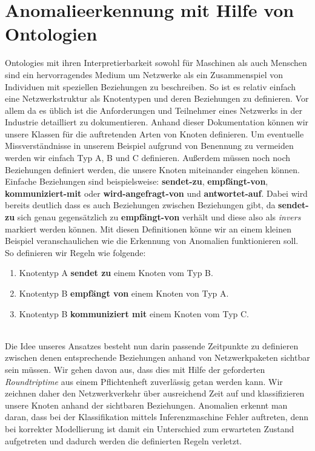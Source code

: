 \section{\nohyphens{Anomalieerkennung mit Hilfe von Ontologien}}
\Glspl{Ontologie} mit ihren Interpretierbarkeit sowohl für Maschinen als auch Menschen sind ein hervorragendes Medium um Netzwerke als ein Zusammenspiel von Individuen mit speziellen Beziehungen zu beschreiben. So ist es relativ einfach eine Netzwerkstruktur als Knotentypen und deren Beziehungen zu definieren. Vor allem da es üblich ist die Anforderungen und Teilnehmer eines Netzwerks in der Industrie detailliert zu dokumentieren. Anhand dieser Dokumentation können wir unsere Klassen für die auftretenden Arten von Knoten definieren. Um eventuelle Missverständnisse in unserem Beispiel aufgrund von Benennung zu vermeiden werden wir einfach Typ A, B und C definieren. Außerdem müssen noch noch Beziehungen definiert werden, die unsere Knoten miteinander eingehen können. Einfache Beziehungen sind beispielsweise: \textbf{sendet-zu}, \textbf{empfängt-von}, \textbf{kommuniziert-mit} oder \textbf{wird-angefragt-von} und \textbf{antwortet-auf}. Dabei wird bereits deutlich dass es auch Beziehungen zwischen Beziehungen gibt, da \textbf{sendet-zu} sich genau gegensätzlich zu \textbf{empfängt-von} verhält und diese also als  \textit{invers} markiert werden können. Mit diesen Definitionen könne wir an einem kleinen Beispiel veranschaulichen wie die Erkennung von Anomalien funktionieren soll.\\
So definieren wir Regeln wie folgende:
\begin{enumerate}
\item Knotentyp A \textbf{sendet zu} einem Knoten vom Typ B.
\item Knotentyp B \textbf{empfängt von} einem Knoten von Typ A.
\item Knotentyp B \textbf{kommuniziert mit} einem Knoten vom Typ C.
\end{enumerate}
\par
[TODO: BILD]\\
Die Idee unseres Ansatzes besteht nun darin passende Zeitpunkte zu definieren zwischen denen entsprechende Beziehungen anhand von Netzwerkpaketen sichtbar sein müssen. Wir gehen davon aus, dass dies mit Hilfe der geforderten \textit{\Gls{Roundtriptime}} aus einem Pflichtenheft zuverlässig getan werden kann. Wir zeichnen daher den Netzwerkverkehr über ausreichend Zeit auf und klassifizieren unsere Knoten anhand der sichtbaren Beziehungen. Anomalien erkennt man daran, dass bei der Klassifikation mittels Inferenzmaschine Fehler auftreten, denn bei korrekter Modellierung ist damit ein Unterschied zum erwarteten Zustand aufgetreten und dadurch werden die definierten Regeln verletzt.
